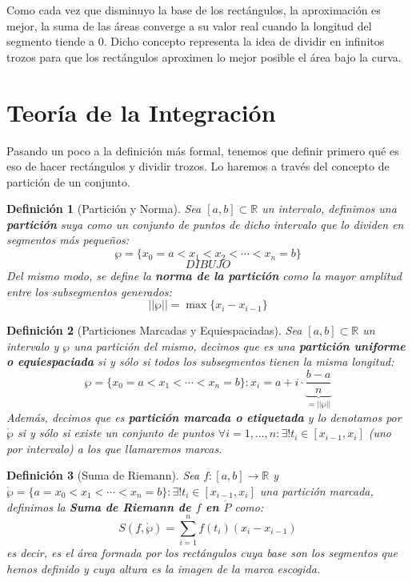 \documentclass[10pt,a4paper,openright]{book}
\theoremstyle{break}
\newtheorem*{defi}{Definición}
\begin{document}
Como cada vez que disminuyo la base de los rectángulos, la aproximación es mejor, la suma de las áreas converge a su valor real cuando la longitud del segmento tiende a 0. Dicho concepto representa la idea de dividir en infinitos trozos  para que los rectángulos aproximen lo mejor posible el área bajo la curva.

\section{Teoría de la Integración}
Pasando un poco a la definición más formal, tenemos que definir primero qué es eso de hacer rectángulos y dividir trozos. Lo haremos a través del concepto de partición de un conjunto.
\begin{defi}[Partición y Norma]
Sea $[a,b]\subset \mathbb{R}$ un intervalo, definimos una \textbf{partición} suya como un conjunto de puntos de dicho intervalo que lo dividen en segmentos más pequeños:
$$\wp=\{x_0=a<x_1<x_2<\cdots <x_n=b\}$$
$$DIBUJO$$
Del mismo modo, se define la \textbf{norma de la partición} como  la mayor amplitud entre los subsegmentos generados:
$$||\wp||=\max\{x_i-x_{i-1}\}$$
\end{defi}

\begin{defi}[Particiones Marcadas y Equiespaciadas]
Sea $[a,b]\subset \mathbb{R}$ un intervalo y $\wp$ una partición del mismo, decimos que es una \textbf{partición uniforme o equiespaciada} si y sólo si todos los subsegmentos tienen la misma longitud:
$$\wp=\{x_0=a < x_1< \cdots < x_n=b\}: x_i = a + i \cdot \underbrace{\frac{b-a}{n}}_{=||\wp||}$$
Además, decimos que es \textbf{partición marcada o etiquetada}  y lo denotamos por $\mathring{\wp}$ si y sólo si existe un conjunto de puntos $\forall i = 1, ..., n: \exists! t_i\in [x_{i-1}, x_i]$ (uno por intervalo) a los que llamaremos marcas.
\end{defi}

\begin{defi}[Suma de Riemann]
Sea $f: [a,b]\rightarrow \mathbb R$ y $\mathring{\wp}=\{a=x_0<x_1<\cdots < x_n = b\}: \exists! t_i\in [x_{i-1}, x_i]$ una partición marcada, definimos la \textbf{Suma de Riemann de $f$ en $\mathring{P}$} como:
$$S(f,\mathring{\wp})=\sum_{i=1}^n f(t_i)(x_i-x_{i-1})$$
es decir, es el área formada por los rectángulos cuya base son los segmentos que hemos definido y cuya altura es la imagen de la marca escogida.
\end{defi}
\end{document}
